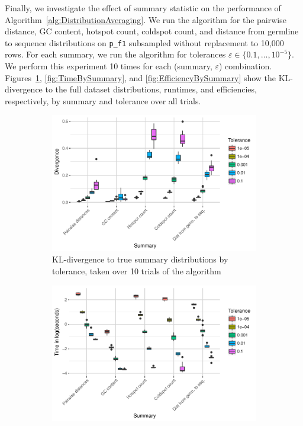 \documentclass{article}
\begin{document}
Finally, we investigate the effect of summary statistic on the performance of Algorithm~\ref{alg:DistributionAveraging}.
We run the algorithm for the pairwise distance, GC content, hotspot count, coldspot count, and distance from germline to sequence distributions on \texttt{p\_f1} subsampled without replacement to 10,000 rows.
For each summary, we run the algorithm for tolerances $\varepsilon \in \{0.1, \dotsc, 10^{-5}\}$.
We perform this experiment 10 times for each (summary, $\varepsilon$) combination.
Figures~\ref{fig:DivBySummary}, \ref{fig:TimeBySummary}, and \ref{fig:EfficiencyBySummary} show the KL-divergence to the full dataset distributions, runtimes, and efficiencies, respectively, by summary and tolerance over all trials.
\begin{figure}
    \begin{subfigure}{0.5\textwidth}
        \includegraphics[width=\linewidth]{Figures/Multiple/div_by_summary_and_tol.pdf}
        \caption{KL-divergence to true summary distributions by tolerance, taken over 10 trials of the algorithm}
        \label{fig:DivBySummary}
    \end{subfigure}
    \begin{subfigure}{0.5\textwidth}
        \includegraphics[width=\linewidth]{Figures/Multiple/time_by_summary_and_tol.pdf}

\end{subfigure}
\end{figure}
\end{document}
